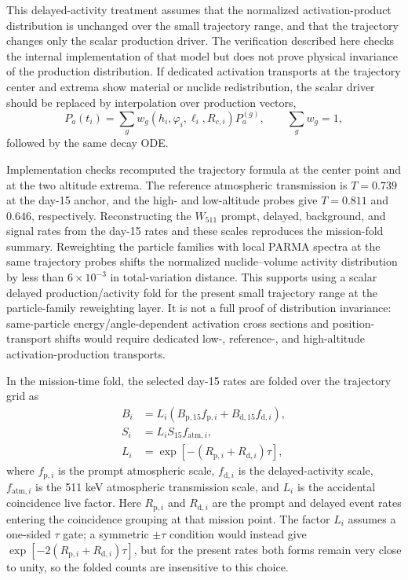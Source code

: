 \documentclass[pdflatex,sn-mathphys-num]{sn-jnl}
\newcommand{\wii}{W_{511}}
\begin{document}
This delayed-activity treatment assumes that the normalized activation-product
distribution is unchanged over the small trajectory range, and that the
trajectory changes only the scalar production driver. The verification
described here checks the internal implementation of that model but does not
prove physical invariance of the production distribution. If dedicated activation transports at the trajectory center and
extrema show material or nuclide redistribution, the scalar driver should be
replaced by interpolation over production vectors,
\begin{equation}
  P_a(t_i)=\sum_g w_g(h_i,\varphi_i,\ell_i,R_{c,i})P_a^{(g)},\qquad
  \sum_g w_g=1,
\end{equation}
followed by the same decay ODE.

Implementation checks recomputed the trajectory formula at the center point and
at the two altitude extrema. The reference atmospheric transmission is
$T=0.739$ at the day-15 anchor, and the high- and low-altitude probes give
$T=0.811$ and $0.646$, respectively. Reconstructing the $\wii$ prompt,
delayed, background, and signal rates from the day-15 rates and these scales
reproduces the mission-fold summary. Reweighting the particle families with local PARMA spectra at the same trajectory probes shifts the normalized nuclide--volume activity distribution by less than $6\times10^{-3}$ in total-variation distance. This supports using a scalar delayed
production/activity fold for the present small trajectory range at the
particle-family reweighting layer. It is not a full proof of distribution
invariance: same-particle energy/angle-dependent activation cross sections and
position-transport shifts would require dedicated low-, reference-, and
high-altitude activation-production transports.

In the mission-time fold, the selected day-15 rates are folded over the
trajectory grid as
\begin{align}
  B_i &= L_i\left(B_{\mathrm{p},15} f_{\mathrm{p},i}
        + B_{\mathrm{d},15} f_{\mathrm{d},i}\right),\\
  S_i &= L_i S_{15} f_{\mathrm{atm},i},\\
  L_i &= \exp[-(R_{\mathrm{p},i}+R_{\mathrm{d},i})\tau],
\end{align}
where $f_{\mathrm{p},i}$ is the prompt atmospheric scale,
$f_{\mathrm{d},i}$ is the delayed-activity scale, $f_{\mathrm{atm},i}$ is the
511 keV atmospheric transmission scale, and $L_i$ is the accidental
coincidence live factor. Here $R_{\mathrm{p},i}$ and $R_{\mathrm{d},i}$ are the
prompt and delayed event rates entering the coincidence grouping at that mission point. The factor $L_i$ assumes a one-sided $\tau$ gate; a symmetric $\pm\tau$ condition would instead give $\exp[-2(R_{\mathrm{p},i}+R_{\mathrm{d},i})\tau]$, but for the present rates both forms remain very close to unity, so the folded counts are insensitive to this choice.
\end{document}
